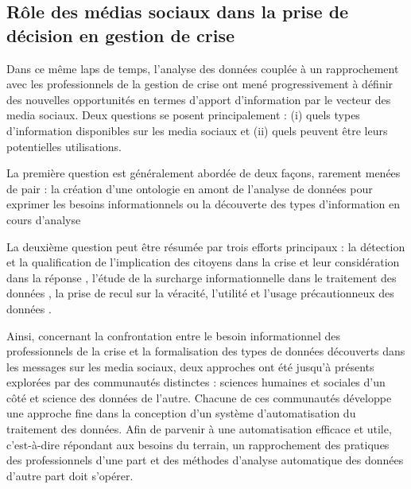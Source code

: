 \subsection*{Rôle des médias sociaux dans la prise de décision en gestion de crise}
Dans ce même laps de temps, l'analyse des données couplée à un rapprochement avec les professionnels de la gestion de crise ont mené progressivement à définir des nouvelles opportunités en termes d'apport d'information par le vecteur des media sociaux.
Deux questions se posent principalement : (i) quels types d'information disponibles sur les media sociaux et (ii) quels peuvent être leurs potentielles utilisations.

La première question est généralement abordée de deux façons, rarement menées de pair : la création d'une ontologie en amont de l'analyse de données pour exprimer les besoins informationnels
\parencite{cocheActionableCollaborativeCommon2019,gaurEmpathiOntologyEmergency2019,moiDesignOntologyUse2016,montarnalAutomatedEmergenceCrisis2017,narayanasamyCrisisDisasterSituations2019b}
ou la découverte des types d'information en cours d'analyse \parencite{kawtrakulImprovingDisasterResponsiveness2012,kemavuthanonIntegratedQuestionansweringSystem2020,leeConstructionEventOntology2013}

La deuxième question peut être résumée par trois efforts principaux : la détection et la qualification de l'implication des citoyens dans la crise et leur considération dans la réponse
\parencite{batardIntegrerContributionsCitoyennes2021,cobbDesigningDelugeUnderstanding2014,graceCommunityCoordinationAligning2018},
l'étude de la surcharge informationnelle dans le traitement des données \parencite{kaufholdMitigatingInformationOverload2020,moiStrategyProcessingAnalyzing2016,norri-sederholmEnsuringInformationFlow2017,onealTrainingEmergencyresponseImage2019},
la prise de recul sur la véracité, l'utilité et l'usage précautionneux des données \parencite{mehtaTrustVerifySocial2017,tapiaTrustworthyTweetDeeper2013,tapiaGoodEnoughGood2014,vangorpJustKeepTweeting2015}.

Ainsi, concernant la confrontation entre le besoin informationnel des
professionnels de la crise et la formalisation des types de données découverts
dans les messages sur les media sociaux, deux approches ont été jusqu'à présents
explorées par des communautés distinctes : sciences humaines et sociales d'un
côté et science des données de l'autre.
Chacune de ces communautés développe une approche fine dans la conception d'un système d'automatisation du traitement des données.
Afin de parvenir à une automatisation efficace et utile, c'est-à-dire répondant aux besoins du terrain, un rapprochement des pratiques des professionnels d'une part et des méthodes d'analyse automatique des données d'autre part doit s'opérer.

